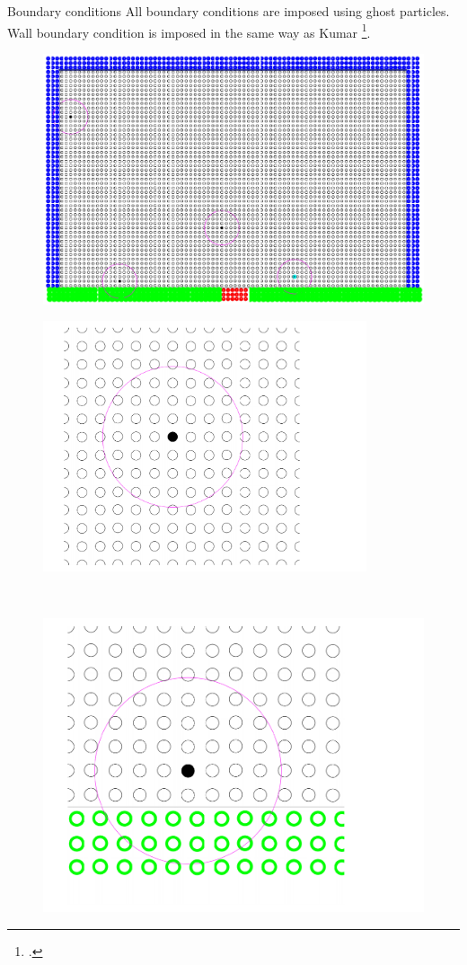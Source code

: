 \documentclass{beamer}
\begin{document}
\begin{frame}{Boundary conditions}
All boundary conditions are imposed using ghost particles. Wall boundary condition is imposed in the same way as Kumar \footcite{kumar2013parallel}.
\center 
\begin{minipage}{0.61 \textwidth}
\begin{figure}
\includegraphics[width=0.89 \textwidth]{./PPT/BC_shot}
\end{figure}
\end{minipage}
\begin{minipage}{0.27 \textwidth}
\begin{figure}
\includegraphics[width=0.85\textwidth]{./PPT/BC_real}
\end{figure}
\end{minipage}
\\
\flushleft
\begin{minipage}{0.325 \textwidth}
\begin{figure}
\includegraphics[width=0.71 \textwidth]{./PPT/BC_wall2}

\end{figure}
\end{minipage}
\end{frame}
\end{document}
